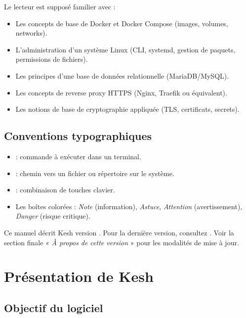 \documentclass[a4paper,11pt,oneside]{article}
\begin{document}
Le lecteur est supposé familier avec :

\begin{itemize}
    \item Les concepts de base de Docker et Docker Compose (images, volumes, networks).
    \item L'administration d'un système Linux (CLI, systemd, gestion de paquets, permissions de fichiers).
    \item Les principes d'une base de données relationnelle (MariaDB/MySQL).
    \item Les concepts de reverse proxy HTTPS (Nginx, Traefik ou équivalent).
    \item Les notions de base de cryptographie appliquée (TLS, certificats, secrets).
\end{itemize}

\subsection{Conventions typographiques}

\begin{itemize}
    \item {} : commande à exécuter dans un terminal.
    \item {} : chemin vers un fichier ou répertoire sur le système.
    \item {} : combinaison de touches clavier.
    \item Les boîtes colorées : \emph{Note} (information), \emph{Astuce}, \emph{Attention} (avertissement), \emph{Danger} (risque critique).
\end{itemize}

\begin{keshnote}
Ce manuel décrit Kesh version \keshVersion. Pour la dernière version, consultez \keshWebsite. Voir la section finale « \emph{À propos de cette version} » pour les modalités de mise à jour.
\end{keshnote}

\section{Présentation de Kesh}

\subsection{Objectif du logiciel}
\end{document}
